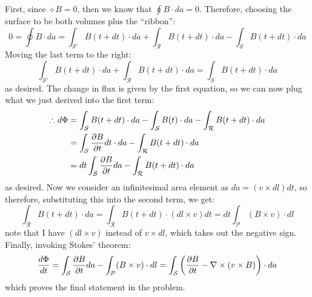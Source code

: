 \documentclass[10pt]{article}
\begin{document}
\begin{enumerate}[label=\alph*)]
			\begin{solution}
				First, since $\div B = 0$, then we know that $\oint B \cdot da = 0$. Therefore, 
				choosing the surface to be both volumes plus the ``ribbon'': 
				\[
					0 = \oint B  \cdot da = \int_{\mathcal S'} B (t + dt) \cdot da + \int_{\mathcal R}
					B(t + dt) \cdot da - \int_{\mathcal S} B(t + dt) \cdot da 
				\] 
				Moving the last term to the right:
				\[
					\int_{\mathcal S'} B(t + dt) \cdot da + \int_{\mathcal R} B(t + dt) \cdot da = \int_{\mathcal S} B(t + dt) \cdot da
				\] 
				as desired. The change in flux is given by the first equation, so we can now plug what we just derived into the first term:
				\begin{align*}
                    \therefore d\Phi &= \int_{\mathcal{S}}{B}(t+dt)\cdot d{a} - \int_{\mathcal{S}}{B}(t)\cdot da - \int_{\mathcal{R}}B(t+dt)\cdot da\\
					&= \int_{\mathcal{S}}\pdv{B}{t}dt \cdot da - \int_{\mathcal{R}}B(t+dt)\cdot da\\
					&= dt\int_{\mathcal{S}}\pdv{B}{t}da - \int_{\mathcal{R}}B(t+dt)\cdot da
                \end{align*}
				as desired. Now we consider an infinitesimal area element as $da = (v \times dl) dt$, so therefore, substituting this into the second term, we get:
				\[ \int_{\mathcal{R}}B(t+dt)\cdot da = \int_{\mathcal{R}}B(t+dt)\cdot(dl\times v)dt = dt\int_{\mathcal{P}}(B\times v)\cdot dl\]
				note that I have $(dl \times v)$ instead of $v \times dl$, which takes out the negative sign. Finally, invoking Stokes' theorem:
				\[ \frac{d\Phi}{dt} = \int_{\mathcal{S}}\pdv{B}{t}da - \int_{\mathcal{P}}(B\times v)\cdot dl = \int_{\mathcal{S}}\left(\pdv{B}{t} - \nabla \times(v \times B)\right)\cdot da\]
				which proves the final statement in the problem.
			\end{solution}
	\end{enumerate}
\end{document}
